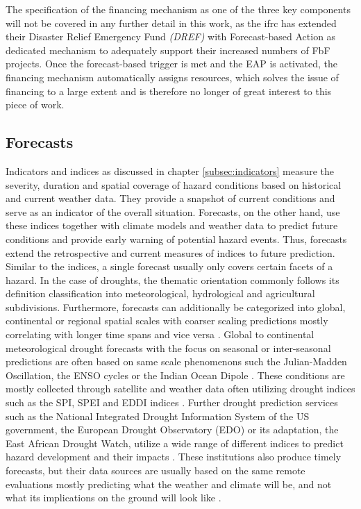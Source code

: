 The specification of the financing mechanism as one of the three key components will not be covered in any further detail in this work, as the \acrshort{ifrc} has extended their Disaster Relief Emergency Fund \textit{(DREF)} with Forecast-based Action as dedicated mechanism to adequately support their increased numbers of FbF projects. Once the forecast-based trigger is met and the EAP is activated, the financing mechanism automatically assigns resources, which solves the issue of financing to a large extent and is therefore no longer of great interest to this piece of work.


\subsection{Forecasts}

Indicators and indices as discussed in chapter \ref*{subsec:indicators} measure the severity, duration and spatial coverage of hazard conditions based on historical and current weather data. They provide a snapshot of current conditions and serve as an indicator of the overall situation. Forecasts, on the other hand, use these indices together with climate models and weather data to predict future conditions and provide early warning of potential hazard events. Thus, forecasts extend the retrospective and current measures of indices to future prediction.
Similar to the indices, a single forecast usually only covers certain facets of a hazard. In the case of droughts, the thematic orientation commonly follows its definition classification into meteorological, hydrological and agricultural subdivisions. Furthermore, forecasts can additionally be categorized into global, continental or regional spatial scales with coarser scaling predictions mostly correlating with longer time spans and vice versa \autocite{baltiReviewDroughtMonitoring2020}. Global to continental meteorological drought forecasts with the focus on seasonal or inter-seasonal predictions are often based on same scale phenomenons such the Julian-Madden Oscillation, the ENSO cycles or the Indian Ocean Dipole \autocite{andersonMaddenJulianOscillationAffects2022,goreUnderstandingInfluenceENSO2020,yuanInfluencesIndianOcean2008}. These conditions are mostly collected through satellite and weather data often utilizing drought indices such as the SPI, SPEI and EDDI indices \autocite{kimIntegratedDroughtMonitoring2021}. Further drought prediction services such as the National Integrated Drought Information System of the US government, the European Drought Observatory (EDO) or its adaptation, the East African Drought Watch, utilize a wide range of different indices to predict hazard development and their impacts \autocite{europeandroughtobservatoryDroughtIndicators2017,icpacDroughtIndicators2023, nidisOutlooksForecasts2023}. These institutions also produce timely forecasts, but their data sources are usually based on the same remote evaluations mostly predicting what the weather and climate will be, and not what its implications on the ground will look like \autocite{enenkelWhyPredictClimate2020}. 

